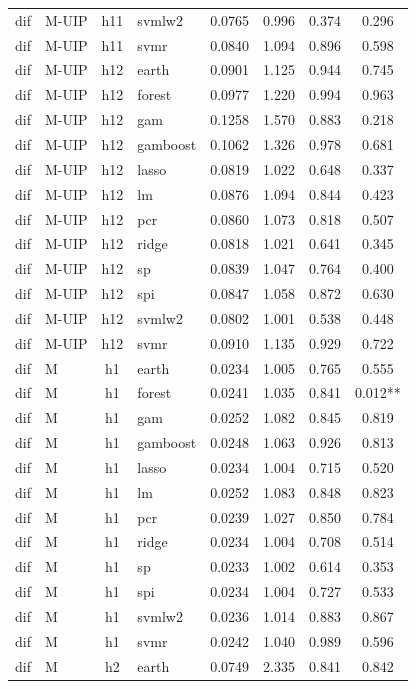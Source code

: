 \begin{ThreePartTable}
\begin{longtable}[t]{llclcccc}
dif & M-UIP & h11 & svmlw2 & 0.0765 & 0.996 & 0.374 & 0.296\\
dif & M-UIP & h11 & svmr & 0.0840 & 1.094 & 0.896 & 0.598\\
\addlinespace
dif & M-UIP & h12 & earth & 0.0901 & 1.125 & 0.944 & 0.745\\
dif & M-UIP & h12 & forest & 0.0977 & 1.220 & 0.994 & 0.963\\
dif & M-UIP & h12 & gam & 0.1258 & 1.570 & 0.883 & 0.218\\
dif & M-UIP & h12 & gamboost & 0.1062 & 1.326 & 0.978 & 0.681\\
dif & M-UIP & h12 & lasso & 0.0819 & 1.022 & 0.648 & 0.337\\
dif & M-UIP & h12 & lm & 0.0876 & 1.094 & 0.844 & 0.423\\
dif & M-UIP & h12 & pcr & 0.0860 & 1.073 & 0.818 & 0.507\\
dif & M-UIP & h12 & ridge & 0.0818 & 1.021 & 0.641 & 0.345\\
dif & M-UIP & h12 & sp & 0.0839 & 1.047 & 0.764 & 0.400\\
dif & M-UIP & h12 & spi & 0.0847 & 1.058 & 0.872 & 0.630\\
dif & M-UIP & h12 & svmlw2 & 0.0802 & 1.001 & 0.538 & 0.448\\
dif & M-UIP & h12 & svmr & 0.0910 & 1.135 & 0.929 & 0.722\\
\addlinespace
dif & M & h1 & earth & 0.0234 & 1.005 & 0.765 & 0.555\\
dif & M & h1 & forest & 0.0241 & 1.035 & 0.841 & 0.012**\\
dif & M & h1 & gam & 0.0252 & 1.082 & 0.845 & 0.819\\
dif & M & h1 & gamboost & 0.0248 & 1.063 & 0.926 & 0.813\\
dif & M & h1 & lasso & 0.0234 & 1.004 & 0.715 & 0.520\\
dif & M & h1 & lm & 0.0252 & 1.083 & 0.848 & 0.823\\
dif & M & h1 & pcr & 0.0239 & 1.027 & 0.850 & 0.784\\
dif & M & h1 & ridge & 0.0234 & 1.004 & 0.708 & 0.514\\
dif & M & h1 & sp & 0.0233 & 1.002 & 0.614 & 0.353\\
dif & M & h1 & spi & 0.0234 & 1.004 & 0.727 & 0.533\\
dif & M & h1 & svmlw2 & 0.0236 & 1.014 & 0.883 & 0.867\\
dif & M & h1 & svmr & 0.0242 & 1.040 & 0.989 & 0.596\\
\addlinespace
dif & M & h2 & earth & 0.0749 & 2.335 & 0.841 & 0.842\\

\end{longtable}
\end{ThreePartTable}
